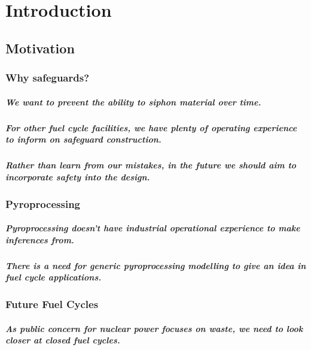 \chapter[Introduction]{Introduction}
\section{Motivation}
\subsection{Why safeguards?}
\paragraph{We want to prevent the ability to siphon material over time.}

\paragraph{For other fuel cycle facilities, we have plenty of operating experience to inform on safeguard construction.}

\paragraph{Rather than learn from our mistakes, in the future we should aim to incorporate safety into the design.}

\subsection{Pyroprocessing}

\paragraph{Pyroprocessing doesn't have industrial operational experience to make inferences from.}

\paragraph{There is a need for generic pyroprocessing modelling to give an idea in fuel cycle applications.}

\subsection{Future Fuel Cycles}

\paragraph{As public concern for nuclear power focuses on waste, we need to look closer at closed fuel cycles.}

